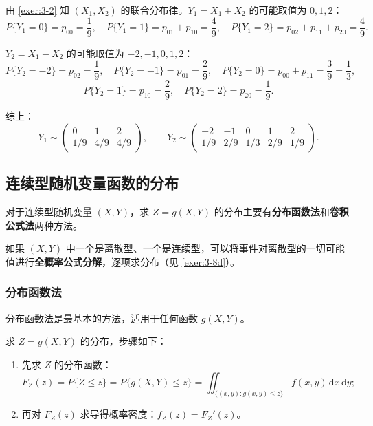 \documentclass[lang=cn,11pt]{elegantbook}
\begin{document}
\begin{solution}
由 \ref{exer:3-2} 知 $(X_1, X_2)$ 的联合分布律。$Y_1 = X_1 + X_2$ 的可能取值为 $0, 1, 2$：
\[
P\{Y_1 = 0\} = p_{00} = \frac{1}{9}, \quad P\{Y_1 = 1\} = p_{01} + p_{10} = \frac{4}{9}, \quad P\{Y_1 = 2\} = p_{02} + p_{11} + p_{20} = \frac{4}{9}.
\]

$Y_2 = X_1 - X_2$ 的可能取值为 $-2, -1, 0, 1, 2$：
\[
P\{Y_2 = -2\} = p_{02} = \frac{1}{9}, \quad P\{Y_2 = -1\} = p_{01} = \frac{2}{9}, \quad P\{Y_2 = 0\} = p_{00} + p_{11} = \frac{3}{9} = \frac{1}{3},
\]
\[
P\{Y_2 = 1\} = p_{10} = \frac{2}{9}, \quad P\{Y_2 = 2\} = p_{20} = \frac{1}{9}.
\]

综上：
\[
Y_1 \sim \begin{pmatrix} 0 & 1 & 2 \\ 1/9 & 4/9 & 4/9 \end{pmatrix}, \qquad Y_2 \sim \begin{pmatrix} -2 & -1 & 0 & 1 & 2 \\ 1/9 & 2/9 & 1/3 & 2/9 & 1/9 \end{pmatrix}.
\]
\end{solution}

\subsection{连续型随机变量函数的分布}

对于连续型随机变量 $(X,Y)$，求 $Z = g(X,Y)$ 的分布主要有\textbf{分布函数法}和\textbf{卷积公式法}两种方法。

如果 $(X,Y)$ 中一个是离散型、一个是连续型，可以将事件对离散型的一切可能值进行\textbf{全概率公式分解}，逐项求分布（见 \ref{exer:3-8d}）。

\subsubsection{分布函数法}

分布函数法是最基本的方法，适用于任何函数 $g(X,Y)$。

\begin{property}[分布函数法]\label{prop:df-method}
求 $Z = g(X,Y)$ 的分布，步骤如下：
\begin{enumerate}
    \item 先求 $Z$ 的分布函数：
    \[
    F_Z(z) = P\{Z \leqslant z\} = P\{g(X,Y) \leqslant z\} = \iint_{\{(x,y): g(x,y) \leqslant z\}}f(x,y)\,\mathrm{d}x\,\mathrm{d}y;
    \]
    \item 再对 $F_Z(z)$ 求导得概率密度：$f_Z(z) = F_Z'(z)$。
\end{enumerate}
\end{property}
\end{document}
